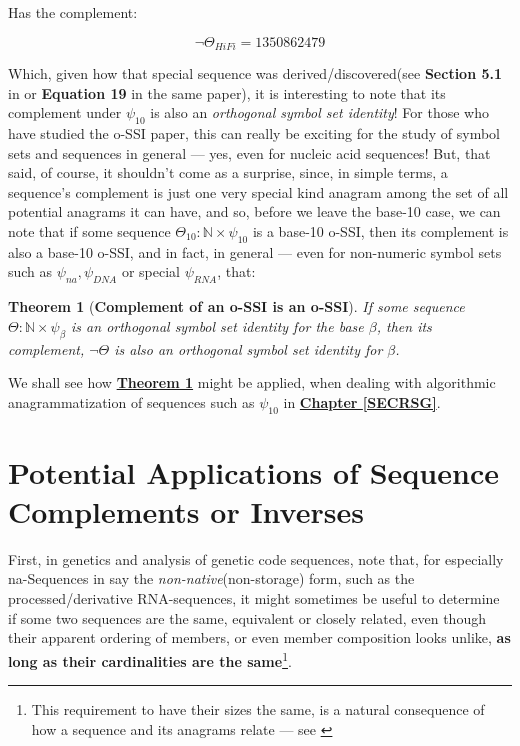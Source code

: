 \documentclass[a4paper, 18pt]{book} %
\newtheorem{theo}{Theorem}
\begin{document}
Has the complement:


\begin{equation}
\lnot\Theta_{HiFi} = 1 3 5 0 8 6 2 4 7 9
\end{equation}

Which, given how that special sequence was derived/discovered(see \textbf{Section 5.1} in \cite{ossipaper} or \textbf{Equation 19} in the same paper), it is interesting to note that its complement under $\psi_{10}$ is also an \textit{orthogonal symbol set identity}! For those who have studied the o-SSI paper\cite{ossipaper}, this can really be exciting for the study of symbol sets and sequences in general --- yes, even for nucleic acid sequences! But, that said, of course, it shouldn't come as a surprise, since, in simple terms, a sequence's complement is just one very special kind anagram among the set of all potential anagrams it can have, and so, before we leave the base-10 case, we can note that if some sequence $\Theta_{10}: \mathbb{N} \times \psi_{10}$ is a base-10 o-SSI, then its complement is also a base-10 o-SSI, and in fact, in general --- even for non-numeric symbol sets such as $\psi_{na}, \psi_{DNA}$ or special $\psi_{RNA}$, that:\\


\begin{theo}[\textbf{Complement of an o-SSI is an o-SSI}]
\label{THEOCOMPLOSSI}
If some sequence $\Theta: \mathbb{N} \times \psi_\beta$ is an orthogonal symbol set identity for the base $\beta$, then its complement, $\lnot\Theta$ is also an orthogonal symbol set identity for $\beta$.\\
\end{theo}

We shall see how \textbf{\hyperref[THEOCOMPLOSSI]{Theorem  \ref{THEOCOMPLOSSI}}} might be applied, when dealing with algorithmic anagrammatization of sequences such as $\psi_{10}$ in \textbf{\hyperref[SECRSG]{Chapter \ref{SECRSG}}}.

\section{Potential Applications of Sequence Complements or Inverses}
\label{SECAPPCOMPLEMENTS}

First, in genetics and analysis of genetic code sequences, note that, for especially na-Sequences in say the \textit{non-native}(non-storage) form, such as the processed/derivative RNA-sequences, it might sometimes be useful to determine if some two sequences are the same, equivalent or closely related, even though their apparent ordering of members, or even member composition looks unlike, \textbf{as long as their cardinalities are the same}\footnote{This requirement to have their sizes the same, is a natural consequence of how a sequence and its anagrams relate --- see \cite{adtpaper}}.
\end{document}
